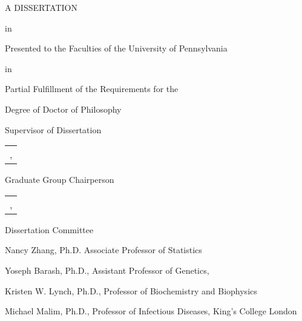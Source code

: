 \documentclass[11pt]{report} %
\begin{document}
\begin{titlepage}
	\thispagestyle{empty} %
	\begin{center}

	\onehalfspacing

	\mytitle

	\myauthor

	A DISSERTATION

	in 

	\mydepartment 


	Presented to the Faculties of the University of Pennsylvania

	in 

	Partial Fulfillment of the Requirements for the

	Degree of Doctor of Philosophy

	\myyear

	\end{center}

	\vfill %

	\begin{flushleft}

	Supervisor of Dissertation\\[\signatures] %

	\renewcommand{\tabcolsep}{0 pt}
	\begin{table}[h]
	\begin{tabularx}{\maxlen}{l}
	\toprule
	\mysupervisorname, \mysupervisortitle\\ %
	\end{tabularx}
	\end{table}

	Graduate Group Chairperson\\[\signatures] %

	\begin{table}[h]
	\begin{tabularx}{\maxlen}{l}
	\toprule
	\gradchairname, \gradchairtitle\\ %
	\end{tabularx}
	\end{table}
	\singlespacing

	Dissertation Committee %

	Nancy Zhang, Ph.D. Associate Professor of Statistics%

	Yoseph Barash, Ph.D., Assistant Professor of Genetics,%

	Kristen W. Lynch, Ph.D., Professor of Biochemistry and Biophysics%

	Michael Malim, Ph.D., Professor of Infectious Diseases, King's College London

	\end{flushleft}
\end{titlepage}
\end{document}
